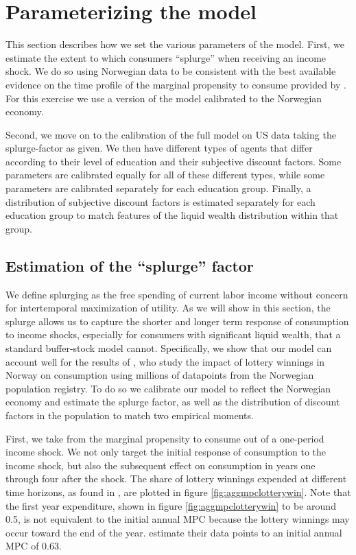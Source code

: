 \documentclass[../HAFiscal]{subfiles}
\begin{document}
\section{Parameterizing the model}

This section describes how we set the various parameters of the model. First, we estimate the extent to which consumers ``splurge'' when receiving an income shock. We do so using Norwegian data to be consistent with the best available evidence on the time profile of the marginal propensity to consume provided by \citet{fagereng_mpc_2021}. For this exercise we use a version of the model calibrated to the Norwegian economy. 

Second, we move on to the calibration of the full model on US data taking the splurge-factor as given. We then have different types of agents that differ according to their level of education and their subjective discount factors. Some parameters are calibrated equally for all of these different types, while some parameters are calibrated separately for each education group. Finally, a distribution of subjective discount factors is estimated separately for each education group to match features of the liquid wealth distribution within that group. 

\subsection{Estimation of the ``splurge'' factor}
\label{sec:splurge}

We define splurging as the free spending of current labor income without concern for intertemporal maximization of utility. As we will show in this section, the splurge allows us to capture the shorter and longer term response of consumption to income shocks, especially for consumers with significant liquid wealth, that a standard buffer-stock model cannot. Specifically, we show that our model can account well for the results of \citet{fagereng_mpc_2021}, who study the impact of lottery winnings in Norway on consumption using millions of datapoints from the Norwegian population registry. To do so we calibrate our model to reflect the Norwegian economy and estimate the splurge factor, as well as the distribution of discount factors in the population to match two empirical moments. 

First, we take from \citet{fagereng_mpc_2021} the marginal propensity to consume out of a one-period income shock. We not only target the initial response of consumption to the income shock, but also the subsequent effect on consumption in years one through four after the shock. The share of lottery winnings expended at different time horizons, as found in \citet{fagereng_mpc_2021}, are plotted in figure \ref{fig:aggmpclotterywin}. Note that the first year expenditure, shown in figure \ref{fig:aggmpclotterywin} to be around 0.5, is not equivalent to the initial annual MPC because the lottery winnings may occur toward the end of the year. \citet{fagereng_mpc_2021} estimate their data points to an initial annual MPC of 0.63.
\end{document}
